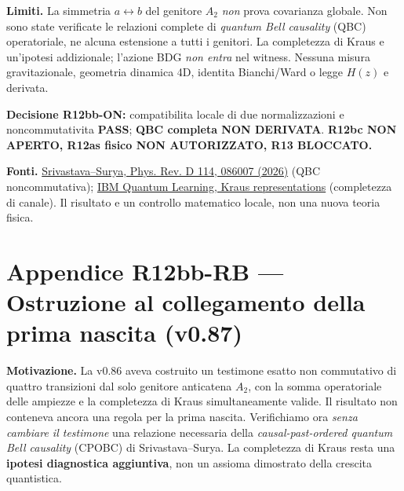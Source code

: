 \documentclass[11pt,a4paper]{article}
\begin{document}
\textbf{Limiti.} La simmetria $a\leftrightarrow b$ del genitore $A_2$ \emph{non} prova covarianza globale. Non sono state verificate le relazioni complete di \emph{quantum Bell causality} (QBC) operatoriale, ne alcuna estensione a tutti i genitori. La completezza di Kraus e un'ipotesi addizionale; l'azione BDG \emph{non entra} nel witness. Nessuna misura gravitazionale, geometria dinamica 4D, identita Bianchi/Ward o legge $H(z)$ e derivata.

\textbf{Decisione R12bb-ON:} compatibilita locale di due normalizzazioni e noncommutativita \textbf{PASS}; \textbf{QBC completa NON DERIVATA}. \textbf{R12bc NON APERTO, R12as fisico NON AUTORIZZATO, R13 BLOCCATO.}

\textbf{Fonti.} \href{https://doi.org/10.1103/thx5-dknv}{Srivastava--Surya, Phys. Rev. D 114, 086007 (2026)} (QBC noncommutativa); \href{https://eu-de.quantum.cloud.ibm.com/learning/en/courses/general-formulation-of-quantum-information/quantum-channels/representations-of-channels}{IBM Quantum Learning, Kraus representations} (completezza di canale). Il risultato e un controllo matematico locale, non una nuova teoria fisica.

\clearpage
\section*{Appendice R12bb-RB --- Ostruzione al collegamento della prima nascita (v0.87)}
\textbf{Motivazione.} La v0.86 aveva costruito un testimone esatto non commutativo di quattro transizioni dal solo genitore anticatena $A_2$, con la somma operatoriale delle ampiezze e la completezza di Kraus simultaneamente valide. Il risultato non conteneva ancora una regola per la prima nascita. Verifichiamo ora \emph{senza cambiare il testimone} una relazione necessaria della \emph{causal-past-ordered quantum Bell causality} (CPOBC) di Srivastava--Surya. La completezza di Kraus resta una \textbf{ipotesi diagnostica aggiuntiva}, non un assioma dimostrato della crescita quantistica.
\end{document}
